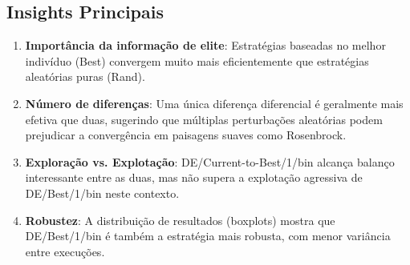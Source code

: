 \documentclass[runningheads]{llncs}
\begin{document}
\subsection{Insights Principais}

\begin{enumerate}
    \item \textbf{Importância da informação de elite}: Estratégias baseadas no melhor indivíduo (Best) convergem muito mais eficientemente que estratégias aleatórias puras (Rand).
    
    \item \textbf{Número de diferenças}: Uma única diferença diferencial é geralmente mais efetiva que duas, sugerindo que múltiplas perturbações aleatórias podem prejudicar a convergência em paisagens suaves como Rosenbrock.
    
    \item \textbf{Exploração vs. Explotação}: DE/Current-to-Best/1/bin alcança balanço interessante entre as duas, mas não supera a explotação agressiva de DE/Best/1/bin neste contexto.
    
    \item \textbf{Robustez}: A distribuição de resultados (boxplots) mostra que DE/Best/1/bin é também a estratégia mais robusta, com menor variância entre execuções.
\end{enumerate}
\end{document}
